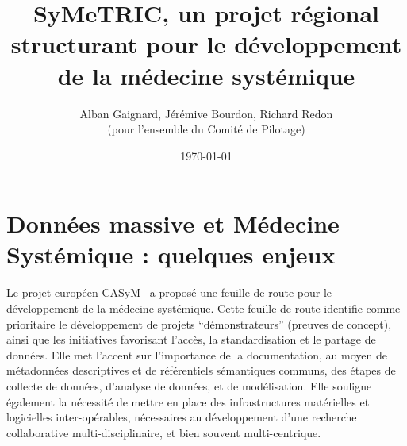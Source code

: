 \documentclass[a4paper,11pt]{article}
\title{\bf SyMeTRIC, un projet régional structurant pour le développement de la médecine systémique}
\author{
  Alban Gaignard, Jérémive Bourdon, Richard Redon \\(pour l'ensemble du Comité de Pilotage)
}
\date{\today}
\theoremstyle{definition}
\begin{document}
\parindent=0pt
\thispagestyle{empty}
\renewcommand{\labelitemi}{$\bullet$}
\renewcommand{\labelitemii}{$\circ$}
\renewcommand{\labelitemiii}{$\diamond$}


\maketitle 


\section{Données massive et Médecine Systémique : quelques enjeux} 
Le projet européen CASyM~\cite{XX} a proposé une feuille de route pour le développement de la médecine systémique. Cette feuille de route identifie comme prioritaire le développement de projets “démonstrateurs” (preuves de concept), ainsi que les initiatives favorisant l’accès, la standardisation et le partage de données. Elle met l’accent sur l’importance de la documentation, au moyen de métadonnées descriptives et de référentiels sémantiques communs, des étapes de collecte de données, d’analyse de données, et de modélisation. Elle souligne également la nécessité de mettre en place des infrastructures matérielles et logicielles inter-opérables, nécessaires au développement d’une recherche collaborative multi-disciplinaire, et bien souvent multi-centrique. 
\end{document}
